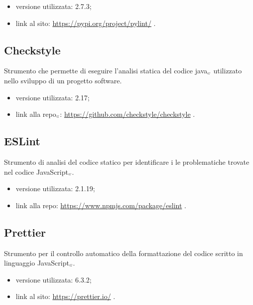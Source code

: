 \begin{itemize}
  \item versione utilizzata: 2.7.3;
  \item link al sito: \url{https://pypi.org/project/pylint/} .
\end{itemize}

\subsection{Checkstyle}\label{LibrerieCheckstyle}
Strumento che permette di eseguire l’analisi statica del codice java$_{\scaleto{G}{3pt}}$ utilizzato nello sviluppo di un progetto software.

\begin{itemize}
  \item versione utilizzata: 2.17;
  \item link alla repo$_{\scaleto{G}{3pt}}$: \url{https://github.com/checkstyle/checkstyle} .
\end{itemize}

\subsection{ESLint}\label{LibrerieESLint}
Strumento di analisi del codice statico per identificare i le problematiche trovate nel codice JavaScript$_{\scaleto{G}{3pt}}$.

\begin{itemize}
  \item versione utilizzata: 2.1.19;
  \item link alla repo: \url{https://www.npmjs.com/package/eslint} .
\end{itemize}

\subsection{Prettier}\label{LibreriePrettier}
Strumento per il controllo automatico della formattazione del codice scritto in linguaggio JavaScript$_{\scaleto{G}{3pt}}$.

\begin{itemize}
  \item versione utilizzata: 6.3.2;
  \item link al sito: \url{https://prettier.io/} .
\end{itemize}
